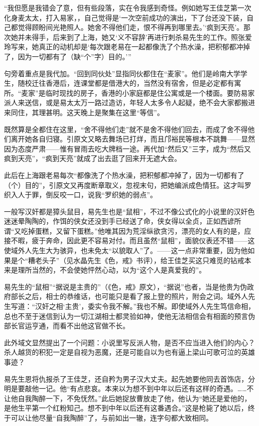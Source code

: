 \par “我但愿是我错会了意，但有些段落，实在令我感到奇怪。例如她写王佳芝第一次化身麦太太，打入易家，，自己觉得是‘一次空前成功的演出，下了台还没下装，自己都觉得顾盼间光艳照人。她舍不得他们走，恨不得再到哪里去。’‘疯到天亮’。那次她并未得手，后来到了上海，她又‘义不容辞’再进行刺杀易先生的工作。照张爱玲写来，她真正的动机却是‘每次跟老易在一起都像洗了个热水澡，把积郁都冲掉了，因为一切都有了（缺“个”字）目的。'”
\par 句旁着重点是我代加。“回到同伙处”显指同伙都住在“麦家”。他们是岭南大学学生，随校迁往香港后，连课堂都是借港大的，当然没有宿舍，但是必定都有寓所。“麦家”是临时现找的房子，香港的小家庭都是住公寓或是一个楼面。要防易家派人来送信，或是易太太万一路过造访，年轻人太多令人起疑，绝不会大家都搬进来同住，其理甚明。这天晚上是聚集在这里“等信”。
\par 既然算是全都住在这里，“舍不得他们走”就不是舍不得他们回去，而成了舍不得他们离开她各自归寝。引原文又略去舞场已打烊，而且邝裕民等根本不跳舞——显然因为态度严肃——惟有冒雨去吃大牌档一途。再代加“然后又”三字，成为“然后又疯到天亮”，“疯到天亮”就成了出去逛了回来开无遮大会。
\par 此后在上海跟老易每次“都像洗了个热水澡，把积郁都冲掉了，因为一切都有了（个）目的”，引原文又再度断章取义，忽视末句，把她编派成色情狂。这才叫罗织入人于罪，倒反咬一口，说我“罗织她的弱点”。
\par 一般写汉奸都是獐头鼠目，易先生也是“鼠相”，不过不像公式化的小说里的汉奸色迷迷晕陶陶的，作饵的侠女还没到手已经送了命，侠女得以全贞，正如西谚所谓“又吃掉蛋糕，又留下蛋糕。”他唯其因为荒淫纵欲贪污，漂亮的女人有的是，应接不暇，疲于奔命，因此更不容易对付。而且虽然“鼠相”，面貌仪表还不错——这使域外人先生大为骇异，也未免太“以貌取人”了。——这一点非常重要，因为他如果是个“糟老头子”（见水晶先生《色，戒》书评），给王佳芝买这只难觅的钻戒本来是理所当然的，不会使她怦然心动，以为“这个人是真爱我的”。
\par 易先生的“鼠相”“据说是主贵的”（《色，戒》原文），“据说”也者，当是他贵为伪政府部长之后，相士的恭维话，也可能只是看了报上登的照片，附会之词。域外人先生写道：“汉奸之相‘主贵’，委实令我不解。”我也不解。即使域外人先生笃信命相，总也不至于迷信到认为一切江湖相士都灵验如神，使他无法相信会有相面的预言伪部长官运亨通，而看不出他这官做不长。
\par 此外域文显然提出了一个问题：小说里写反派人物，是否不应当进入他们的内心？杀人越货的积犯一定是自视为恶魔，还是可能自以为也有逼上梁山可歌可泣的英雄事迹？
\par 易先生恩将仇报杀了王佳芝，还自矜为男子汉大丈夫。起先她要他同去首饰店，分明是要敲他一记。他“有点悲哀。本来以为想不到中年以后还有这样的奇遇。……不让他自我陶醉一下，不免怃然。”此后她捉放曹放走了他，他认为“她还是爱他的，是他生平第一个红粉知己。想不到中年以后还有这番遇合。”这是枪毙了她以后，终于可以让他尽量“自我陶醉”了，与前如出一辙，连字句都大致相同。
